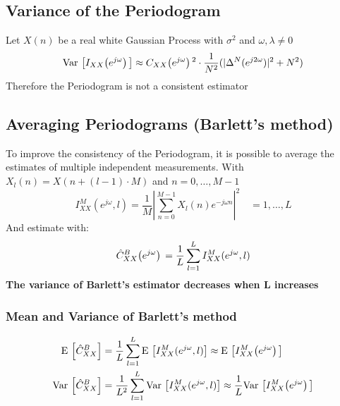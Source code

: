 \documentclass[accentcolor=tud4c,9.5pt,nochapname,bigchapter,paper=a5report]{tudreport}
\begin{document}
\subsection{Variance of the Periodogram}
Let $X(n)$ be a real white Gaussian Process with $\sigma^2$ and $\omega,\lambda \neq 0$
\begin{equation}
{\rm Var}\,\left[I_{XX}{\left(e^{j\omega}\right)}\,\right] \approx C_{XX}{\left(e^{j\omega}\right)}\,^2 \cdot \frac{1}{N^2}(|\Delta^N(e^{j2\omega})|^2+N^2)
\end{equation}
Therefore the Periodogram is not a consistent estimator

\subsection{Averaging Periodograms (Barlett's method)}
To improve the consistency of the Periodogram, it is 
possible to average the estimates of multiple independent measurements. With $X_l(n)=X(n+(l-1)\cdot M)$ and $n=0,\ldots,M-1$
\begin{equation}
I_{XX}^M(e^{j\omega},l)=\frac{1}{M}\left|\sum\limits_{n=0}^{M-1} X_l(n) e^{-j\omega n}\right|^2 \quad = 1,\ldots,L
\end{equation}
And estimate with:
\begin{equation}
\hat{C}_{XX}^B{\left(e^{j\omega}\right)}\, = \frac{1}{L}\sum\limits_{l=1}^{L} I_{XX}^M (e^{j\omega},l)
\end{equation}
{\bf The variance of Barlett's estimator decreases when L increases}

\subsubsection{Mean and Variance of Barlett's method}
\begin{subequations}
\begin{align}
{\rm E}\,\left[\hat{C}_{XX}^B\right]&=\frac{1}{L}\sum\limits_{l=1}^L {\rm E}\,\left[I_{XX}^M(e^{j\omega},l)\right] \approx {\rm E}\, \left[I_{XX}^M{\left(e^{j\omega}\right)}\,\right]\\
{\rm Var}\,\left[\hat{C}_{XX}^B\right]&=\frac{1}{L^2}\sum\limits_{l=1}^L {\rm Var}\,\left[I_{XX}^M(e^{j\omega},l)\right] \approx \frac{1}{L}{\rm Var}\, \left[I_{XX}^M{\left(e^{j\omega}\right)}\,\right]
\end{align}
\end{subequations}
\end{document}

